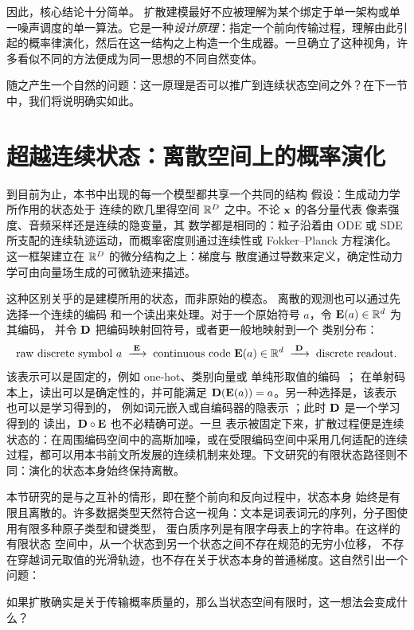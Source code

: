 因此，核心结论十分简单。
扩散建模最好不应被理解为某个绑定于单一架构或单一噪声调度的单一算法。它是一种\emph{设计原理}：指定一个前向传输过程，理解由此引起的概率律演化，然后在这一结构之上构造一个生成器。一旦确立了这种视角，许多看似不同的方法便成为同一思想的不同自然变体。

随之产生一个自然的问题：这一原理是否可以推广到连续状态空间之外？在下一节中，我们将说明确实如此。

\clearpage
\newpage


\section{超越连续状态：离散空间上的概率演化}
\label{sec:epilogue-discrete}

到目前为止，本书中出现的每一个模型都共享一个共同的结构
假设：生成动力学所作用的状态处于
连续的欧几里得空间 $\mathbb{R}^D$ 之中。不论 ${\mathbf{x}}$ 的各分量代表
像素强度、音频采样还是连续的隐变量，其
数学都是相同的：粒子沿着由 ODE 或 SDE 所支配的连续轨迹运动，而概率密度则通过连续性或
Fokker--Planck 方程演化。这一框架建立在 $\mathbb{R}^D$ 的微分结构之上：梯度与
散度通过导数来定义，确定性动力学可由向量场生成的可微轨迹来描述。

这种区别关乎的是建模所用的状态，而非原始的模态。
离散的观测也可以通过先选择一个连续的编码
和一个读出来处理。对于一个原始符号 $a$，令 ${\mathbf{E}}(a)\in\mathbb{R}^d$ 为其编码，
并令 ${\mathbf{D}}$ 把编码映射回符号，或者更一般地映射到一个
类别分布：
\[
\text{raw discrete symbol } a
\;\xrightarrow{\;{\mathbf{E}}\;}\;
\text{continuous code } {\mathbf{E}}(a)\in\mathbb{R}^d
\;\xrightarrow{\;{\mathbf{D}}\;}\;
\text{discrete readout}.
\]
该表示可以是固定的，例如 one-hot、类别向量或
单纯形取值的编码~\citep{richemond2022categorical}；
在单射码本上，读出可以是确定性的，并可能满足
${\mathbf{D}}({\mathbf{E}}(a))=a$。另一种选择是，该表示也可以是学习得到的，
例如词元嵌入或自编码器的隐表示
\citep{li2022diffusionlm,dieleman2022continuous}；此时 ${\mathbf{D}}$ 是一个学习得到的
读出，${\mathbf{D}}\circ{\mathbf{E}}$ 也不必精确可逆。一旦
表示被固定下来，扩散过程便是连续状态的：在周围编码空间中的高斯加噪，或在受限编码空间中采用几何适配的连续过程，都可以用本书前文所发展的连续机制来处理。下文研究的有限状态路径则不同：演化的状态本身始终保持离散。

本节研究的是与之互补的情形，即在整个前向和反向过程中，状态本身
始终是有限且离散的。许多数据类型天然符合这一视角：文本是词表词元的序列，分子图使用有限多种原子类型和键类型，
蛋白质序列是有限字母表上的字符串。在这样的有限状态
空间中，从一个状态到另一个状态之间不存在规范的无穷小位移，
不存在穿越词元取值的光滑轨迹，也不存在关于状态本身的普通梯度。这自然引出一个问题：
\begin{question}
    如果扩散确实是关于传输概率质量的，那么当状态空间有限时，这一想法会变成什么？
\end{question}

